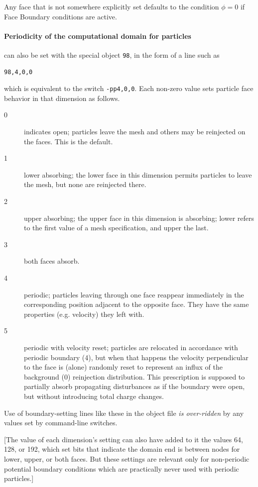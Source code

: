 \documentclass[12pt]{article}
\begin{document}
Any face that is not somewhere explicitly set defaults to the
condition $\phi=0$ if Face Boundary conditions are active.

\paragraph{Periodicity of the computational domain for
  particles}\label{partperiod} can
also be set with the special object \verb!98!, in the form of a line
such as
\begin{verbatim}
98,4,0,0
\end{verbatim} which is equivalent to the switch \verb!-pp4,0,0!.
Each non-zero value sets particle face behavior in that dimension as follows.

\begin{description}
\item[0]  indicates open; particles leave the mesh and others may be
reinjected on the faces. This is the default. 
\item[1] lower absorbing; the lower face in this dimension permits particles
to leave the mesh, but none are reinjected there.
\item[2] upper absorbing; the upper face in this dimension is absorbing;
lower refers to the first value of a mesh specification, and upper the
last.
\item[3] both faces absorb.
\item[4] periodic; particles leaving through one face reappear
  immediately in the corresponding position adjacent to the opposite
  face. They have the same properties (e.g. velocity) they left with.
\item[5] periodic with velocity reset; particles are relocated in
  accordance with periodic boundary (4), but when that happens the
  velocity perpendicular to the face is (alone) randomly reset to
  represent an influx of the background (0) reinjection distribution.
  This prescription is supposed to partially absorb propagating
  disturbances as if the boundary were open, but without introducing
  total charge changes.
\end{description}

Use of boundary-setting lines like these in the object file
\emph{is over-ridden} by any values set by command-line switches.

[The value of each dimension's setting can also have added to it the
values 64, 128, or 192, which set bits that indicate the domain end is
between nodes for lower, upper, or both faces. But these settings are
relevant only for non-periodic potential boundary conditions which are
practically never used with periodic particles.]
\end{document}

